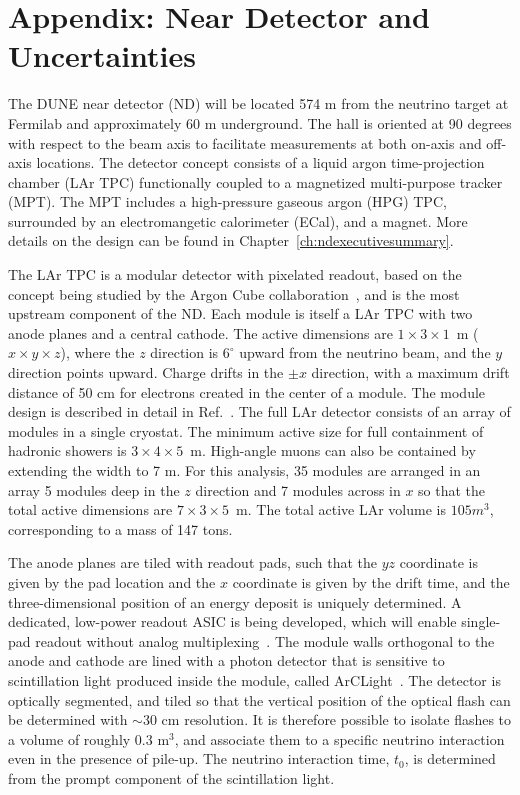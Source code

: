 \section{Appendix: Near Detector and Uncertainties}\label{sec:nu-osc-12}\label{sec:physics-lbnosc-ND-app}

The DUNE near detector (ND) will be located 574 m from the neutrino target at Fermilab and approximately 60 m underground. The hall is oriented at 90 degrees with respect to the beam axis to facilitate measurements at both on-axis and off-axis locations. The detector concept consists of a liquid argon time-projection chamber (LAr TPC) functionally coupled to a magnetized multi-purpose tracker (MPT). The MPT includes a high-pressure gaseous argon (HPG) TPC, surrounded by an electromangetic calorimeter (ECal), and a magnet. More details on the design can be found in Chapter~\ref{ch:ndexecutivesummary}.

The LAr TPC is a modular detector with pixelated readout, based on the concept being studied by the Argon Cube collaboration~\cite{ArgonCube}, and is the most upstream component of the ND. Each module is itself a LAr TPC with two anode planes and a central cathode. The active dimensions are $1 \times 3 \times 1$~m ($x \times y \times z$), where the $z$ direction is $6^{\circ}$ upward from the neutrino beam, and the $y$ direction points upward. Charge drifts in the $\pm x$ direction, with a maximum drift distance of 50 cm for electrons created in the center of a module. The module design is described in detail in Ref.~\cite{ArgonCube}. The full LAr detector consists of an array of modules in a single cryostat. The minimum active size for full containment of hadronic showers is $3 \times 4 \times 5$~m. High-angle muons can also be contained by extending the width to 7 m. For this analysis, 35 modules are arranged in an array 5 modules deep in the $z$ direction and 7 modules across in $x$ so that the total active dimensions are $7 \times 3 \times 5$~m. The total active LAr volume is $105 m^{3}$, corresponding to a mass of 147 tons.

The anode planes are tiled with readout pads, such that the $yz$ coordinate is given by the pad location and the $x$ coordinate is given by the drift time, and the three-dimensional position of an energy deposit is uniquely determined. A dedicated, low-power readout ASIC is being developed, which will enable single-pad readout without analog multiplexing~\cite{LArPix}. The module walls orthogonal to the anode and cathode are lined with a photon detector that is sensitive to scintillation light produced inside the module, called ArCLight~\cite{ArCLight}. The detector is optically segmented, and tiled so that the vertical position of the optical flash can be determined with $\sim$30 cm resolution. It is therefore possible to isolate flashes to a volume of roughly 0.3 m$^{3}$, and associate them to a specific neutrino interaction even in the presence of pile-up. The neutrino interaction time, $t_{0}$, is determined from the prompt component of the scintillation light.

